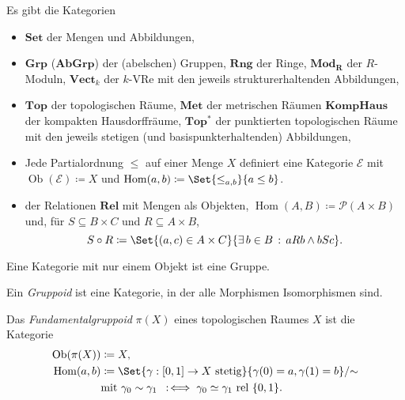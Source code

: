 \documentclass{cheat-sheet}
\newcommand{\rel}{\text{ rel }} %
\DeclareMathOperator{\Ob}{Ob} %
\DeclareMathOperator{\Hom}{Hom} %
\begin{document}
\begin{bspe}
  Es gibt die Kategorien
  \begin{itemize}
    \item $\mathbf{Set}$ der Mengen und Abbildungen,
    \item $\mathbf{Grp}$ ($\mathbf{AbGrp}$) der (abelschen) Gruppen, $\mathbf{Rng}$ der Ringe, $\mathbf{Mod_R}$ der $R$-Moduln, $\mathbf{Vect}_k$ der $k$-VRe mit den jeweils strukturerhaltenden Abbildungen,
    \item $\mathbf{Top}$ der topologischen Räume, $\mathbf{Met}$ der metrischen Räumen $\mathbf{KompHaus}$ der kompakten Hausdorffräume, $\mathbf{Top^*}$ der punktierten topologischen Räume mit den jeweils stetigen (und basispunkterhaltenden) Abbildungen,
    \item Jede Partialordnung $\leq$ auf einer Menge $X$ definiert eine Kategorie $\mathcal{E}$ mit $\Ob(\mathcal{E}) \coloneqq X$ und $\Hom(a, b) \coloneqq \Set{ {\leq}_{a,b} }{ a \leq b }$.
    \item der Relationen $\mathbf{Rel}$ mit Mengen als Objekten, $\Hom(A, B) \coloneqq \mathcal{P}(A \times B)$ und, für $S \subseteq B \times C$ und $R \subseteq A \times B$,
    \[ S \circ R \coloneqq \Set{ (a, c) \in A \times C }{ \ex{b \in B} aRb \wedge bSc }. \]
  \end{itemize}
\end{bspe}

\begin{bem}
  Eine Kategorie mit nur einem Objekt ist eine Gruppe.
\end{bem}

\begin{defn}
  Ein \emph{Gruppoid} ist eine Kategorie, in der alle Morphismen Isomorphismen sind.
\end{defn}

\begin{defn}
  Das \emph{Fundamentalgruppoid} $\pi(X)$ eines topologischen Raumes $X$ ist die Kategorie
  \begin{align*}
    \Ob(\pi(X)) & \coloneqq X,\\
    \Hom(a, b) & \coloneqq \Set{ \gamma : \I \to X \text{ stetig} }{ \gamma(0) = a, \gamma(1) = b }/{\sim}\\
    & \text{mit } \gamma_0 \sim \gamma_1 \coloniff \gamma_0 \simeq \gamma_1 \rel \{ 0, 1\}.
  \end{align*}
\end{defn}
\end{document}
